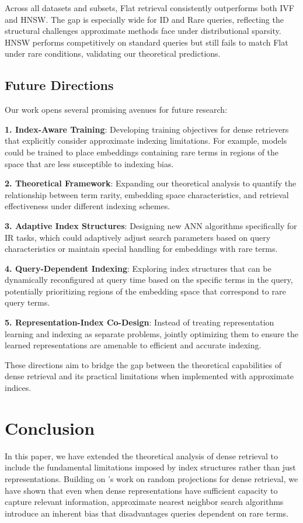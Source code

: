 \documentclass[manuscript]{acmart}
\begin{document}
Across all datasets and subsets, Flat retrieval consistently outperforms both IVF and HNSW. The gap is especially wide for ID and Rare queries, reflecting the structural challenges approximate methods face under distributional sparsity. HNSW performs competitively on standard queries but still fails to match Flat under rare conditions, validating our theoretical predictions.


\subsection{Future Directions}
Our work opens several promising avenues for future research:

\textbf{1. Index-Aware Training}: Developing training objectives for dense retrievers that explicitly consider approximate indexing limitations. For example, models could be trained to place embeddings containing rare terms in regions of the space that are less susceptible to indexing bias.

\textbf{2. Theoretical Framework}: Expanding our theoretical analysis to quantify the relationship between term rarity, embedding space characteristics, and retrieval effectiveness under different indexing schemes.

\textbf{3. Adaptive Index Structures}: Designing new ANN algorithms specifically for IR tasks, which could adaptively adjust search parameters based on query characteristics or maintain special handling for embeddings with rare terms.

\textbf{4. Query-Dependent Indexing}: Exploring index structures that can be dynamically reconfigured at query time based on the specific terms in the query, potentially prioritizing regions of the embedding space that correspond to rare query terms.

\textbf{5. Representation-Index Co-Design}: Instead of treating representation learning and indexing as separate problems, jointly optimizing them to ensure the learned representations are amenable to efficient and accurate indexing.

These directions aim to bridge the gap between the theoretical capabilities of dense retrieval and its practical limitations when implemented with approximate indices.

\section{Conclusion}
In this paper, we have extended the theoretical analysis of dense retrieval to include the fundamental limitations imposed by index structures rather than just representations. Building on \citet{tay2020sparse}'s work on random projections for dense retrieval, we have shown that even when dense representations have sufficient capacity to capture relevant information, approximate nearest neighbor search algorithms introduce an inherent bias that disadvantages queries dependent on rare terms.
\end{document}
